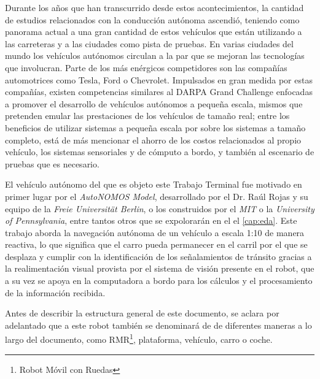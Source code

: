 \documentclass[12pt, letterpaper, oneside]{book}
\begin{document}
	\par Durante los años que han transcurrido desde estos acontecimientos, la cantidad de estudios relacionados con la conducción autónoma ascendió, teniendo como panorama actual a una gran cantidad de estos vehículos que están utilizando a las carreteras y a las ciudades como pista de pruebas. En varias ciudades del mundo los vehículos autónomos circulan a la par que se mejoran las tecnologías que involucran. Parte de los más enérgicos competidores son las compañías automotrices como Tesla, Ford o Chevrolet. Impulsados en gran medida por estas compañías, existen competencias similares al DARPA Grand Challenge enfocadas a promover el desarrollo de vehículos autónomos a pequeña escala, mismos que pretenden emular las prestaciones de los vehículos de tamaño real; entre los beneficios de utilizar sistemas a pequeña escala por sobre los sistemas a tamaño completo, está de más mencionar el ahorro de los costos relacionados al propio vehículo, los sistemas sensoriales y de cómputo a bordo, y también al escenario de pruebas que es necesario. 
	\par El vehículo autónomo del que es objeto este Trabajo Terminal fue motivado en primer lugar por el {\it AutoNOMOS Model}, desarrollado por el Dr. Raúl Rojas y su equipo de la {\it Freie Universität Berlin}, o los construidos por el {\it MIT} o la {\it University of Pennsylvania}, entre tantos otros que se expolorarán en el el \autoref{cap:eda}. Este trabajo aborda la navegación autónoma de un vehículo a escala 1:10 de manera reactiva, lo que significa que el carro pueda permanecer en el carril por el que se desplaza y cumplir con la identificación de los señalamientos de tránsito gracias a la realimentación visual provista por el sistema de visión presente en el robot, que a su vez se apoya en la computadora a bordo para los cálculos y el procesamiento de la información recibida.
	\par Antes de describir la estructura general de este documento, se aclara por adelantado que a este robot también se denominará de de diferentes maneras a lo largo del documento, como RMR\footnote{Robot Móvil con Ruedas}, plataforma, vehículo, carro o coche.
\end{document}
